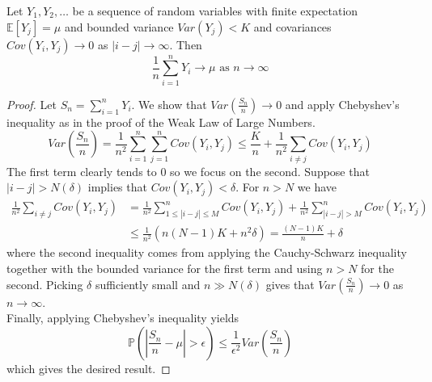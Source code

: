 \documentclass[a4paper]{article}
\renewcommand{\P}{\mathbb P}
\renewcommand{\E}{\mathbb E}
\begin{document}
\begin{theorem}
  Let $Y_1,Y_2, \dots$ be a sequence of random variables with finite expectation $\E[Y_j] = \mu$ and bounded variance $Var(Y_j) < K$ and covariances $Cov(Y_i, Y_j) \to 0$ as $|i-j| \to \infty$. Then
  \[\frac{1}{n}\sum_{i = 1}^n Y_i \to \mu \text{ as } n \to \infty\]
\end{theorem}
\begin{proof}
  Let $S_n = \sum_{i=1}^n Y_i$. We show that $Var\left(\frac{S_n}{n}\right) \to 0$ and apply Chebyshev's inequality as in the proof of the Weak Law of Large Numbers.\\
  \[Var(\frac{S_n}{n}) = \frac{1}{n^2} \sum_{i=1}^n\sum_{j=1}^n Cov(Y_i, Y_j) \leq \frac{K}{n} + \frac{1}{n^2}\sum_{i \neq j}Cov(Y_i, Y_j)\]
  The first term clearly tends to 0 so we focus on the second. Suppose that $|i-j| > N(\delta)$ implies that $Cov(Y_i, Y_j) < \delta$. For $n > N$ we have
  \begin{align*}
    \frac{1}{n^2}\sum_{i \neq j}Cov(Y_i, Y_j)&=\frac{1}{n^2}\sum_{1 \leq |i-j| \leq M}^n Cov(Y_i, Y_j) + \frac{1}{n^2}\sum_{|i-j| > M}^n Cov(Y_i, Y_j)\\
    &\leq \frac{1}{n^2}\left(n(N-1)K + n^2\delta\right) = \frac{(N-1)K}{n} + \delta
  \end{align*}
  where the second inequality comes from applying the Cauchy-Schwarz inequality together with the bounded variance for the first term and using $n > N$ for the second. Picking $\delta$ sufficiently small and $n \gg N(\delta)$ gives that $Var\left(\frac{S_n}{n}\right) \to 0$ as $n \to \infty$.\\
  Finally, applying Chebyshev's inequality yields
  \[\P\left(\left| \frac{S_n}{n} - \mu\right| > \epsilon \right) \leq \frac{1}{\epsilon^2}Var\left(\frac{S_n}{n}\right)\]
  which gives the desired result.
\end{proof}
\end{document}
